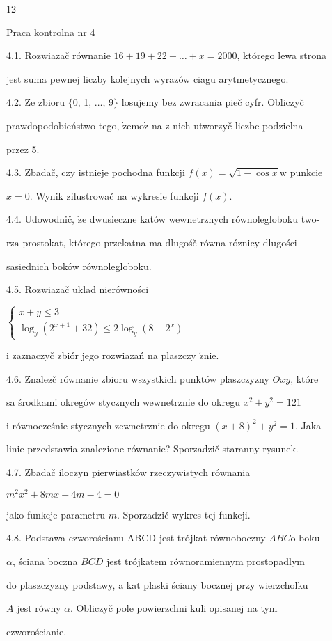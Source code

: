 \documentclass[a4paper,12pt]{article}
\begin{document}
12

Praca kontrolna nr 4

4.1. Rozwiazač równanie $16+19+22+\ldots+x=2000$, którego lewa strona

jest suma pewnej liczby kolejnych wyrazów ciagu arytmetycznego.

4.2. Ze zbioru $\{0$, 1, $\ldots$, 9$\}$ losujemy bez zwracania pieč cyfr. Obliczyč

prawdopodobieństwo tego, $\dot{\mathrm{z}}\mathrm{e}\mathrm{m}\mathrm{o}\dot{\mathrm{z}}$ na $\mathrm{z}$ nich utworzyč liczbe podzielna

przez 5.

4.3. Zbadač, czy istnieje pochodna funkcji $f(x) = \sqrt{1-\cos x}\mathrm{w}$ punkcie

$x=0$. Wynik zilustrowač na wykresie funkcji $f(x).$

4.4. Udowodnič, $\dot{\mathrm{z}}\mathrm{e}$ dwusieczne katów wewnetrznych równolegloboku two-

$\mathrm{r}\mathrm{z}\mathrm{a}$ prostokat, którego przekatna ma dlugośč równa róznicy dlugości

sasiednich boków równolegloboku.

4.5. Rozwiazač uklad nierówności

$\left\{\begin{array}{l}
x+y\leq 3\\
\log_{y}(2^{x+1}+32)\leq 2\log_{y}(8-2^{x})
\end{array}\right.$

$\mathrm{i}$ zaznaczyč zbiór jego rozwiazań na plaszczy $\acute{\mathrm{z}}\mathrm{n}\mathrm{i}\mathrm{e}.$

4.6. Znalez$\acute{}$č równanie zbioru wszystkich punktów plaszczyzny $Oxy$, które

sa środkami okregów stycznych wewnetrznie do okregu $x^{2}+y^{2}=121$

$\mathrm{i}$ równocześnie stycznych zewnetrznie do okregu $(x+8)^{2}+y^{2}=1$. Jaka

linie przedstawia znalezione równanie? Sporzadzič staranny rysunek.

4.7. Zbadač iloczyn pierwiastków rzeczywistych równania

$m^{2}x^{2}+8mx+4m-4=0$

jako funkcje parametru $m$. Sporzadzič wykres tej funkcji.

4.8. Podstawa czworościanu ABCD jest trójkat równoboczny $ABC\mathrm{o}$ boku

$\alpha$, ściana boczna $BCD$ jest trójkatem równoramiennym prostopadlym

do plaszczyzny podstawy, a $\mathrm{k}\mathrm{a}\mathrm{t}$ plaski ściany bocznej przy wierzcholku

$A$ jest równy $\alpha$. Obliczyč pole powierzchni kuli opisanej na tym

czworościanie.
\end{document}
